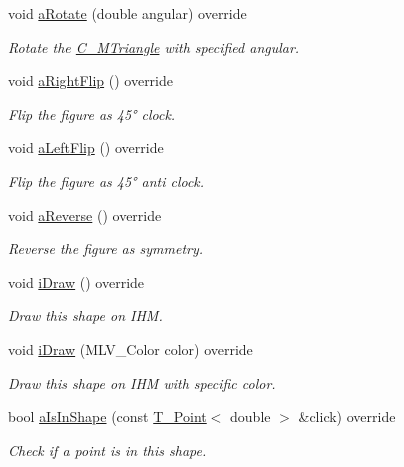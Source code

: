 \begin{DoxyCompactItemize}
void \hyperlink{classC__MTriangle_a33aa36879be70b0a11863801da56e92e}{a\+Rotate} (double angular) override
\begin{DoxyCompactList}\small\item\em Rotate the \hyperlink{classC__MTriangle}{C\+\_\+\+M\+Triangle} with specified angular. \end{DoxyCompactList}\item 
void \hyperlink{classC__MTriangle_aa3a1fc0604fa7e13b6c89d242357a163}{a\+Right\+Flip} () override
\begin{DoxyCompactList}\small\item\em Flip the figure as 45° clock. \end{DoxyCompactList}\item 
void \hyperlink{classC__MTriangle_a3dcac8e1341a79139577deb851a6481e}{a\+Left\+Flip} () override
\begin{DoxyCompactList}\small\item\em Flip the figure as 45° anti clock. \end{DoxyCompactList}\item 
void \hyperlink{classC__MTriangle_a44614f4abb94f1a5f963cfb3e8fce7a5}{a\+Reverse} () override
\begin{DoxyCompactList}\small\item\em Reverse the figure as symmetry. \end{DoxyCompactList}\item 
void \hyperlink{classC__MTriangle_ae75dd212f0b580664affc740945c8d0b}{i\+Draw} () override
\begin{DoxyCompactList}\small\item\em Draw this shape on I\+HM. \end{DoxyCompactList}\item 
void \hyperlink{classC__MTriangle_a049e6026145865387db4244678336784}{i\+Draw} (M\+L\+V\+\_\+\+Color color) override
\begin{DoxyCompactList}\small\item\em Draw this shape on I\+HM with specific color. \end{DoxyCompactList}\item 
bool \hyperlink{classC__MTriangle_ae29e4f6608a0079507c6397b3dbef246}{a\+Is\+In\+Shape} (const \hyperlink{classT__Point}{T\+\_\+\+Point}$<$ double $>$ \&click) override
\begin{DoxyCompactList}\small\item\em Check if a point is in this shape. \end{DoxyCompactList}\item 

\end{DoxyCompactItemize}
